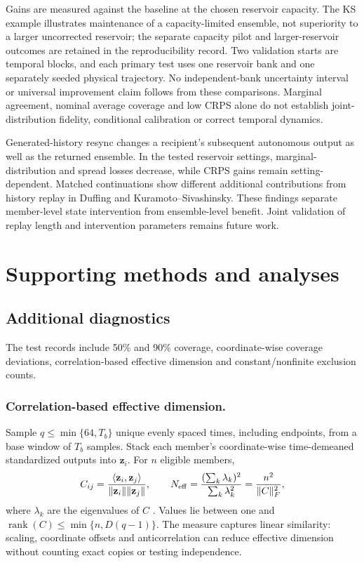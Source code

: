 \documentclass[gmd,manuscript]{copernicus}
\begin{document}
Gains are measured against the baseline at the chosen reservoir capacity. The KS example illustrates maintenance of a capacity-limited ensemble, not superiority to a larger uncorrected reservoir; the separate capacity pilot and larger-reservoir outcomes are retained in the reproducibility record. Two validation starts are temporal blocks, and each primary test uses one reservoir bank and one separately seeded physical trajectory. No independent-bank uncertainty interval or universal improvement claim follows from these comparisons. Marginal agreement, nominal average coverage and low CRPS alone do not establish joint-distribution fidelity, conditional calibration or correct temporal dynamics.




\conclusions
Generated-history resync changes a recipient's subsequent autonomous output as well as the returned ensemble. In the tested reservoir settings, marginal-distribution and spread losses decrease, while CRPS gains remain setting-dependent. Matched continuations show different additional contributions from history replay in Duffing and Kuramoto--Sivashinsky. These findings separate member-level state intervention from ensemble-level benefit. Joint validation of replay length and intervention parameters remains future work.

\appendix
\section{Supporting methods and analyses}
\subsection{Additional diagnostics}\label{app:note1}
The test records include 50\% and 90\% coverage, coordinate-wise coverage deviations, correlation-based effective dimension and constant/nonfinite exclusion counts.
\subsubsection{Correlation-based effective dimension.}
Sample $q\le\min\{64,T_b\}$ unique evenly spaced times, including endpoints, from a base window of $T_b$ samples. Stack each member's coordinate-wise time-demeaned standardized outputs into $\mathbf z_i$. For $n$ eligible members,
\begin{equation}
C_{ij}=\frac{\langle\mathbf z_i,\mathbf z_j\rangle}{\|\mathbf z_i\|\|\mathbf z_j\|},\qquad
N_{\rm eff}=\frac{(\sum_k\lambda_k)^2}{\sum_k\lambda_k^2}
=\frac{n^2}{\|C\|_F^2},
\end{equation}
where $\lambda_k$ are the eigenvalues of $C$ \citep{pennell2010number}. Values lie between one and $\operatorname{rank}(C)\le\min\{n,D(q-1)\}$. The measure captures linear similarity: scaling, coordinate offsets and anticorrelation can reduce effective dimension without counting exact copies or testing independence.
\end{document}
